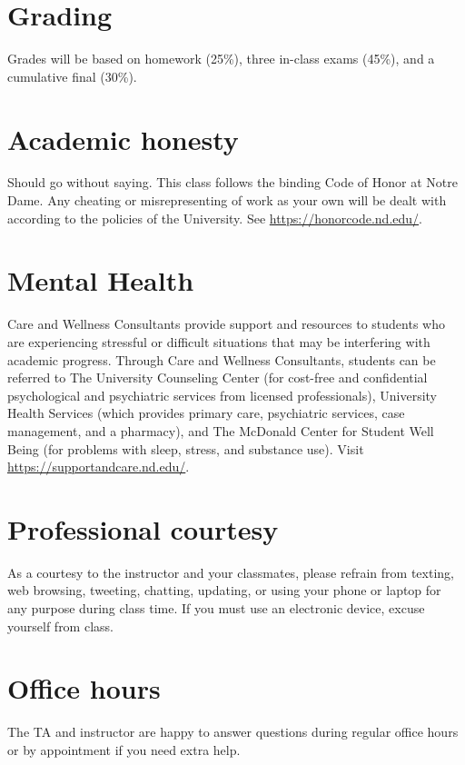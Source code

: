 \documentclass[11pt]{article}
\begin{document}
\section{Grading}
\label{sec:org797cebb}
Grades will be based on homework (25\%), three in-class exams (45\%), and a cumulative final (30\%).

\section{Academic honesty}
\label{sec:orgd7f2b30}
Should go without saying. This class follows the binding Code of Honor
at Notre Dame.  Any cheating or misrepresenting of work as your own
will be dealt with according to the policies of the University.  See \url{https://honorcode.nd.edu/}.

\section{Mental Health}
\label{sec:org0634c47}
Care and Wellness Consultants provide
support and resources to students who are experiencing stressful or difficult
situations that may be interfering with academic progress. Through Care and
Wellness Consultants, students can be referred to The University Counseling
Center (for cost-free and confidential psychological and psychiatric services from
licensed professionals), University Health Services (which provides primary care,
psychiatric services, case management, and a pharmacy), and The McDonald
Center for Student Well Being (for problems with sleep, stress, and substance
use). Visit \href{https://supportandcare.nd.edu/}{https://supportandcare.nd.edu/}.

\section{Professional courtesy}
\label{sec:org6013961}
As a courtesy to the instructor and your classmates, please refrain from
texting, web browsing, tweeting, chatting, updating, or using your phone or laptop for any
purpose during class time.  If you must use an electronic device, excuse
yourself from class.

\section{Office hours}
\label{sec:orgc0e24d7}
The TA and instructor are happy to answer questions during regular office hours or by appointment if you need extra help. 
\end{document}
